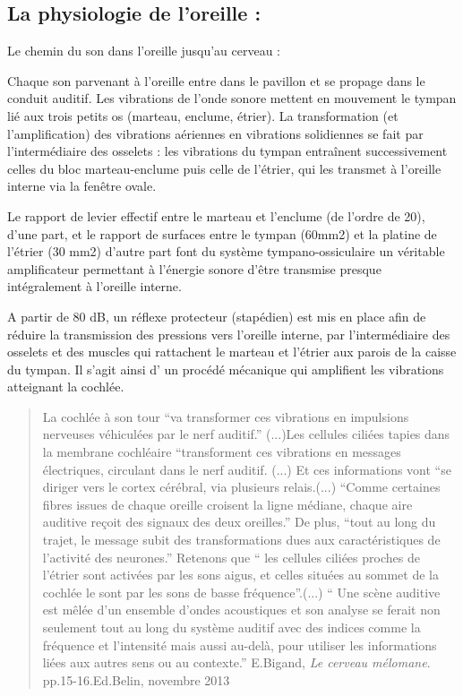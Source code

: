 \documentclass[12pt,french]{report}
\makeatletter
\let\SF@@footnote\footnote
\def\footnote{\ifx\protect\@typeset@protect
    \expandafter\SF@@footnote
  \else
    \expandafter\SF@gobble@opt
  \fi
}
\edef\SF@gobble@opt{\noexpand\protect
  \expandafter\noexpand\csname SF@gobble@opt \endcsname}
\makeatother
\begin{document}
\subsection{La physiologie de l'oreille : }

Le chemin du son dans l'oreille jusqu'au cerveau : 

Chaque son parvenant à l'oreille entre dans le pavillon et se propage
dans le conduit auditif. Les vibrations de l'onde sonore mettent en
mouvement le tympan lié aux trois petits os (marteau, enclume, étrier).
La transformation (et l\textquoteright amplification) des vibrations
aériennes en vibrations solidiennes se fait par l\textquoteright intermédiaire
des osselets : les vibrations du tympan entraînent successivement
celles du bloc marteau-enclume puis celle de l\textquoteright étrier,
qui les transmet à l\textquoteright oreille interne via la fenêtre
ovale.

Le rapport de levier effectif entre le marteau et l\textquoteright enclume
(de l\textquoteright ordre de 20), d\textquoteright une part, et le
rapport de surfaces entre le tympan (60mm2) et la platine de l\textquoteright étrier
(30 mm2) d\textquoteright autre part font du système tympano-ossiculaire
un véritable amplificateur permettant à l\textquoteright énergie sonore
d\textquoteright être transmise presque intégralement à l\textquoteright oreille
interne.

A partir de 80 dB, un réflexe protecteur (stapédien) est mis en place
afin de réduire la transmission des pressions vers l\textquoteright oreille
interne, par l\textquoteright intermédiaire des osselets et des muscles
qui rattachent le marteau et l\textquoteright étrier aux parois de
la caisse du tympan. Il s'agit ainsi d' un procédé mécanique qui amplifient
les vibrations atteignant la cochlée. 
\begin{quotation}
La cochlée à son tour ``va transformer ces vibrations en impulsions
nerveuses véhiculées par le nerf auditif.'' (...)Les cellules ciliées
tapies dans la membrane cochléaire ``transforment ces vibrations
en messages électriques, circulant dans le nerf auditif. (...) Et
ces informations vont ``se diriger vers le cortex cérébral, via plusieurs
relais.(...) ``Comme certaines fibres issues de chaque oreille croisent
la ligne médiane, chaque aire auditive reçoit des signaux des deux
oreilles.'' De plus, ``tout au long du trajet, le message subit
des transformations dues aux caractéristiques de l'activité des neurones.''
Retenons que `` les cellules ciliées proches de l'étrier sont activées
par les sons aigus, et celles situées au sommet de la cochlée le sont
par les sons de basse fréquence''.(...) `` Une scène auditive est
mêlée d'un ensemble d'ondes acoustiques et son analyse se ferait non
seulement tout au long du système auditif avec des indices comme la
fréquence et l'intensité mais aussi au-delà, pour utiliser les informations
liées aux autres sens ou au contexte.'' \footnote{E.Bigand,\emph{ Le cerveau mélomane}. pp.15-16.Ed.Belin, novembre
2013}
\end{quotation}
\end{document}
